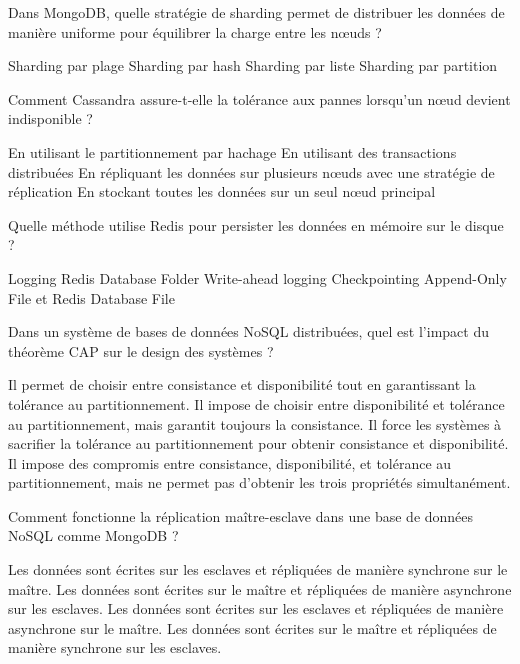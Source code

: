 \documentclass[12pt,a4paper,addpoints,answers]{exam}
\begin{document}
\begin{questions}
		\question[1] Dans MongoDB, quelle stratégie de sharding permet de distribuer les données de manière uniforme pour équilibrer la charge entre les nœuds ?
		\begin{checkboxes}
			\choice Sharding par plage
			\CorrectChoice Sharding par hash
			\choice Sharding par liste
			\choice Sharding par partition
		\end{checkboxes}
		
		\question[1] Comment Cassandra assure-t-elle la tolérance aux pannes lorsqu'un nœud devient indisponible ?
		\begin{checkboxes}
			\choice En utilisant le partitionnement par hachage
			\choice En utilisant des transactions distribuées
			\CorrectChoice En répliquant les données sur plusieurs nœuds avec une stratégie de réplication
			\choice En stockant toutes les données sur un seul nœud principal
		\end{checkboxes}
		
		\question[1] Quelle méthode utilise Redis pour persister les données en mémoire sur le disque ?
		\begin{checkboxes}
			\choice Logging
			\choice Redis Database Folder
			\choice Write-ahead logging
			\choice Checkpointing
			\CorrectChoice Append-Only File et Redis Database File
		\end{checkboxes}
		
		\question[1] Dans un système de bases de données NoSQL distribuées, quel est l'impact du théorème CAP sur le design des systèmes ?
		\begin{checkboxes}
			\choice Il permet de choisir entre consistance et disponibilité tout en garantissant la tolérance au partitionnement.
			\choice Il impose de choisir entre disponibilité et tolérance au partitionnement, mais garantit toujours la consistance.
			\choice Il force les systèmes à sacrifier la tolérance au partitionnement pour obtenir consistance et disponibilité.
			\CorrectChoice Il impose des compromis entre consistance, disponibilité, et tolérance au partitionnement, mais ne permet pas d'obtenir les trois propriétés simultanément.
		\end{checkboxes}
		
		\question[1] Comment fonctionne la réplication maître-esclave dans une base de données NoSQL comme MongoDB ?
		\begin{checkboxes}
			\choice Les données sont écrites sur les esclaves et répliquées de manière synchrone sur le maître.
			\CorrectChoice Les données sont écrites sur le maître et répliquées de manière asynchrone sur les esclaves.
			\choice Les données sont écrites sur les esclaves et répliquées de manière asynchrone sur le maître.
			\choice Les données sont écrites sur le maître et répliquées de manière synchrone sur les esclaves.
		\end{checkboxes}
		

\end{questions}
\end{document}
